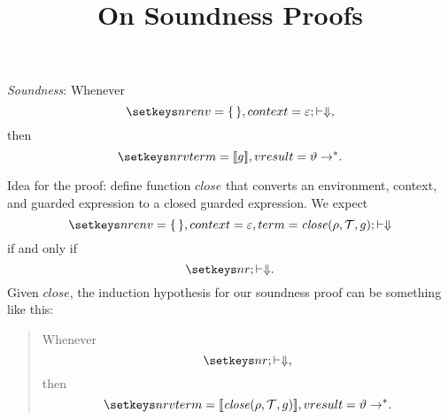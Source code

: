 \documentclass{article}
\title{On Soundness Proofs}
\begin{document}
\maketitle


\noindent
\emph{Soundness}: Whenever
$$\vmrun[env=\emptyenv,context=\emptycontext]\text,$$
then
$$\vrun[vterm=\translation{g},vresult=\vartheta]\text.$$



\newcommand\closefun{\ensuremath{\mathit{close}}}
\newcommand\close[3]{\closefun(#1,#2,#3)}

Idea for the proof: define function $\closefun$ that converts an
environment, context, and guarded expression to a closed guarded
expression.
We expect
$$\vmrun[env=\emptyenv,context=\emptycontext,term=\close\rho\context g]$$
if and only if
$$\vmrun[]\text.$$
Given \closefun, 
the induction hypothesis for our soundness proof can be something like
this:
\begin{quote}
Whenever 
$$\vmrun[]\text,$$
then
$$\vrun[vterm=\translation{\close\rho\context g},vresult=\vartheta]\text.$$
\end{quote}
\end{document}

